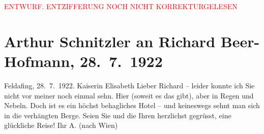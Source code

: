 
\begin{center}
            \textcolor{red}{ENTWURF. ENTZIFFERUNG NOCH NICHT KORREKTURGELESEN}
                      \end{center}
            
               \section[Arthur Schnitzler an Richard Beer-Hofmann, 28. 7. 1922]{ Arthur Schnitzler an Richard Beer-Hofmann, 28. 7. 1922}\nopagebreak{}\rehead{ }\begin{ledgroupsized}[t]{13cm}\normalsize\beginnumbering{} \toendnotes[C]{\smallbreak\pagebreak[2]} 
\toendnotes[C]{\smallbreak}\pstart
           \raggedleft{}{\pb}Feldafing, 28. 7. 1922.\pend
           \pstart
           \raggedleft{}Kaiserin Elisabeth\pend
           \pstart
           Lieber Richard – leider konnte ich Sie nicht vor meiner \label{K_L02554-2v}\label{K_L02554-2h} noch einmal sehn. Hier \label{K_L02554-1v}\label{K_L02554-1h} (soweit es das gibt), aber in Regen und Nebeln. Doch ist es ein höchst
               behagliches Hotel – und
               keineswegs sehnt man sich in die verhängten Berge. Seien Sie und die Ihren herzlichst
               gegrüsst, eine glückliche Reise! Ihr \spacefill\mbox{A.}\pend
           \pstart
           \noindent{}(nach Wien)\pend
           \endnumbering{}\end{ledgroupsized}  \newcommand{\dateiname}{L02554}\newcommand{\titel}{Arthur Schnitzler an Richard Beer-Hofmann, 28. 7. 1922}\newcommand{\editorInnen}{Martin Anton Müller und Gerd-Hermann Susen}
      